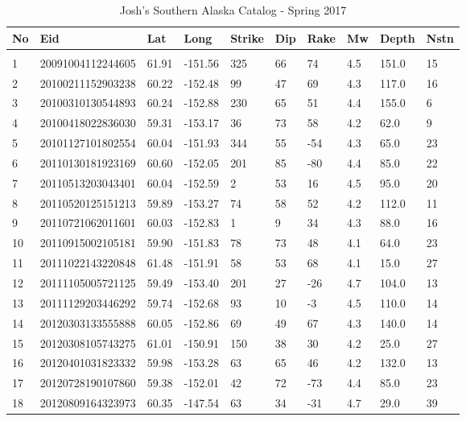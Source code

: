 \documentclass[11pt,titlepage,fleqn]{article}
\begin{document}
\begin{table}[]
\centering
\caption{Josh's Southern Alaska Catalog - Spring 2017}
\label{my-label}
\begin{tabular}{llllllllll}
\hline
No & Eid & Lat & Long & Strike & Dip & Rake & Mw & Depth & Nstn \\ \hline \\
1 & 20091004112244605 & 61.91 & -151.56 & 325 &  66 &  74 & 4.5 & 151.0 & 15 \\ 
2 & 20100211152903238 & 60.22 & -152.48 &  99 &  47 &  69 & 4.3 & 117.0 & 16 \\ 
3 & 20100310130544893 & 60.24 & -152.88 & 230 &  65 &  51 & 4.4 & 155.0 & 6 \\ 
4 & 20100418022836030 & 59.31 & -153.17 &  36 &  73 &  58 & 4.2 & 62.0 & 9 \\ 
5 & 20101127101802554 & 60.04 & -151.93 & 344 &  55 & -54 & 4.3 & 65.0 & 23 \\ 
6 & 20110130181923169 & 60.60 & -152.05 & 201 &  85 & -80 & 4.4 & 85.0 & 22 \\ 
7 & 20110513203043401 & 60.04 & -152.59 &   2 &  53 &  16 & 4.5 & 95.0 & 20 \\ 
8 & 20110520125151213 & 59.89 & -153.27 &  74 &  58 &  52 & 4.2 & 112.0 & 11 \\ 
9 & 20110721062011601 & 60.03 & -152.83 &   1 &   9 &  34 & 4.3 & 88.0 & 16 \\ 
10 & 20110915002105181 & 59.90 & -151.83 &  78 &  73 &  48 & 4.1 & 64.0 & 23 \\ 
11 & 20111022143220848 & 61.48 & -151.91 &  58 &  53 &  68 & 4.1 & 15.0 & 27 \\ 
12 & 20111105005721125 & 59.49 & -153.40 & 201 &  27 & -26 & 4.7 & 104.0 & 13 \\ 
13 & 20111129203446292 & 59.74 & -152.68 &  93 &  10 &  -3 & 4.5 & 110.0 & 14 \\ 
14 & 20120303133555888 & 60.05 & -152.86 &  69 &  49 &  67 & 4.3 & 140.0 & 14 \\ 
15 & 20120308105743275 & 61.01 & -150.91 & 150 &  38 &  30 & 4.2 & 25.0 & 27 \\ 
16 & 20120401031823332 & 59.98 & -153.28 &  63 &  65 &  46 & 4.2 & 132.0 & 13 \\ 
17 & 20120728190107860 & 59.38 & -152.01 &  42 &  72 & -73 & 4.4 & 85.0 & 23 \\ 
18 & 20120809164323973 & 60.35 & -147.54 &  63 &  34 & -31 & 4.7 & 29.0 & 39 \\ 

\end{tabular}
\end{table}
\end{document}
